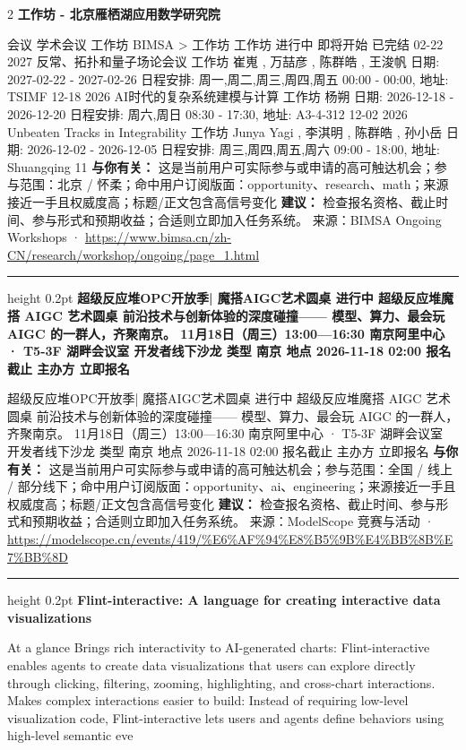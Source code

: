 \documentclass[10.5pt]{ctexart}
\begin{document}
\begin{multicols}{2}
{\large\bfseries 工作坊 - 北京雁栖湖应用数学研究院}\par
会议 学术会议 工作坊 BIMSA > 工作坊 工作坊 进行中 即将开始 已完结 02-22 2027 反常、拓扑和量子场论会议 工作坊 崔嵬 , 万喆彦 , 陈群皓 , 王浚帆 日期: 2027-02-22 - 2027-02-26 日程安排: 周一,周二,周三,周四,周五 00:00 - 00:00, 地址: TSIMF 12-18 2026 AI时代的复杂系统建模与计算 工作坊 杨朔 日期: 2026-12-18 - 2026-12-20 日程安排: 周六,周日 08:30 - 17:30, 地址: A3-4-312 12-02 2026 Unbeaten Tracks in Integrability 工作坊 Junya Yagi , 李淇明 , 陈群皓 , 孙小岳 日期: 2026-12-02 - 2026-12-05 日程安排: 周三,周四,周五,周六 09:00 - 18:00, 地址: Shuangqing 11
\textbf{与你有关：} 这是当前用户可实际参与或申请的高可触达机会；参与范围：北京 / 怀柔；命中用户订阅版面：opportunity、research、math；来源接近一手且权威度高；标题/正文包含高信号变化
\textbf{建议：} 检查报名资格、截止时间、参与形式和预期收益；合适则立即加入任务系统。
{\footnotesize\color{ormuted} 来源：BIMSA Ongoing Workshops · \url{https://www.bimsa.cn/zh-CN/research/workshop/ongoing/page_1.html}}
\vspace{2mm}
\hrule height 0.2pt
\vspace{2mm}
{\large\bfseries 超级反应堆OPC开放季| 魔搭AIGC艺术圆桌 进行中 超级反应堆魔搭 AIGC 艺术圆桌 前沿技术与创新体验的深度碰撞—— 模型、算力、最会玩 AIGC 的一群人，齐聚南京。 11月18日（周三）13:00—16:30 南京阿里中心 · T5-3F 湖畔会议室 开发者线下沙龙 类型 南京 地点 2026-11-18 02:00 报名截止 主办方 立即报名}\par
超级反应堆OPC开放季| 魔搭AIGC艺术圆桌 进行中 超级反应堆魔搭 AIGC 艺术圆桌 前沿技术与创新体验的深度碰撞—— 模型、算力、最会玩 AIGC 的一群人，齐聚南京。 11月18日（周三）13:00—16:30 南京阿里中心 · T5-3F 湖畔会议室 开发者线下沙龙 类型 南京 地点 2026-11-18 02:00 报名截止 主办方 立即报名
\textbf{与你有关：} 这是当前用户可实际参与或申请的高可触达机会；参与范围：全国 / 线上 / 部分线下；命中用户订阅版面：opportunity、ai、engineering；来源接近一手且权威度高；标题/正文包含高信号变化
\textbf{建议：} 检查报名资格、截止时间、参与形式和预期收益；合适则立即加入任务系统。
{\footnotesize\color{ormuted} 来源：ModelScope 竞赛与活动 · \url{https://modelscope.cn/events/419/%E6%AF%94%E8%B5%9B%E4%BB%8B%E7%BB%8D}}
\vspace{2mm}
\hrule height 0.2pt
\vspace{2mm}
{\large\bfseries Flint-interactive: A language for creating interactive data visualizations}\par
At a glance Brings rich interactivity to AI-generated charts: Flint-interactive enables agents to create data visualizations that users can explore directly through clicking, filtering, zooming, highlighting, and cross-chart interactions. Makes complex interactions easier to build: Instead of requiring low-level visualization code, Flint-interactive lets users and agents define behaviors using high-level semantic eve

\end{multicols}
\end{document}
